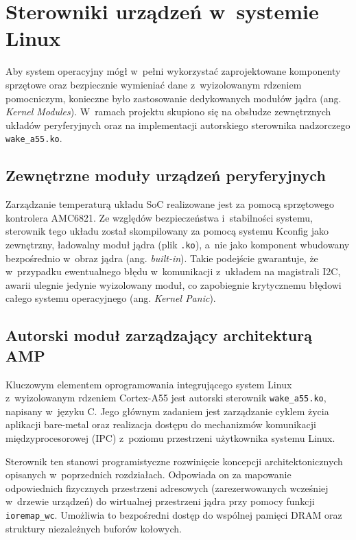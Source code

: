 \chapter{Sterowniki urządzeń w~systemie Linux}
\label{ch:sterowniki}

Aby system operacyjny mógł w~pełni wykorzystać zaprojektowane komponenty sprzętowe oraz bezpiecznie wymieniać dane z~wyizolowanym rdzeniem pomocniczym, konieczne było zastosowanie dedykowanych modułów jądra (ang. \textit{Kernel Modules}). W~ramach projektu skupiono się na obsłudze zewnętrznych układów peryferyjnych oraz na implementacji autorskiego sterownika nadzorczego \texttt{wake\_a55.ko}.

\section{Zewnętrzne moduły urządzeń peryferyjnych}
Zarządzanie temperaturą układu SoC realizowane jest za pomocą sprzętowego kontrolera AMC6821. Ze względów bezpieczeństwa i~stabilności systemu, sterownik tego układu został skompilowany za pomocą systemu Kconfig jako zewnętrzny, ładowalny moduł jądra (plik \texttt{.ko}), a~nie jako komponent wbudowany bezpośrednio w~obraz jądra (ang. \textit{built-in}). Takie podejście gwarantuje, że w~przypadku ewentualnego błędu w~komunikacji z~układem na magistrali I2C, awarii ulegnie jedynie wyizolowany moduł, co zapobiegnie krytycznemu błędowi całego systemu operacyjnego (ang. \textit{Kernel Panic}).

\section{Autorski moduł zarządzający architekturą AMP}
Kluczowym elementem oprogramowania integrującego system Linux z~wyizolowanym rdzeniem Cortex-A55 jest autorski sterownik \texttt{wake\_a55.ko}, napisany w~języku C. Jego głównym zadaniem jest zarządzanie cyklem życia aplikacji bare-metal oraz realizacja dostępu do mechanizmów komunikacji międzyprocesorowej (IPC) z~poziomu przestrzeni użytkownika systemu Linux.

Sterownik ten stanowi programistyczne rozwinięcie koncepcji architektonicznych opisanych w~poprzednich rozdziałach. Odpowiada on za mapowanie odpowiednich fizycznych przestrzeni adresowych (zarezerwowanych wcześniej w~drzewie urządzeń) do wirtualnej przestrzeni jądra przy pomocy funkcji \texttt{ioremap\_wc}. Umożliwia to bezpośredni dostęp do wspólnej pamięci DRAM oraz struktury niezależnych buforów kołowych.

